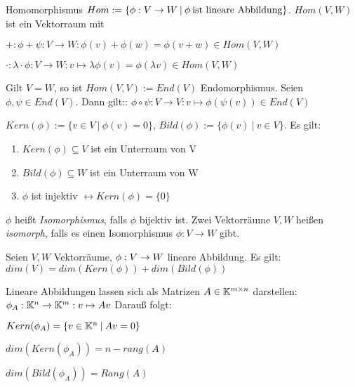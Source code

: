 \begin{definition}
	Homomorphismus $Hom := \{\phi : V \rightarrow W \medspace | \medspace \phi \medspace \textnormal{ist lineare Abbildung}\}$.  $Hom(V,W)$ ist ein Vektorraum mit
	\begin{description}[noitemsep]
		\item $+ : \phi + \psi : V \rightarrow W : \phi(v) + \phi(w) = \phi(v + w) \in Hom(V,W)$
		\item $\cdot : \lambda \cdot \phi : V \rightarrow W : v \mapsto \lambda \phi(v) = \phi(\lambda v) \in Hom(V,W)$
	\end{description}

	Gilt $V = W$, so ist $Hom(V,V) := End(V)$ Endomorphismus. Seien $\phi, \psi \in End(V)$. Dann gilt:: $\phi \circ \psi : V \rightarrow V : v \mapsto \phi(\psi(v)) \in End(V)$
\end{definition}

\begin{definition}
	$Kern(\phi) := \{v \in V \medspace | \medspace \phi(v) = 0\}$, $Bild(\phi) := \{\phi(v) \medspace | \medspace v \in V\}$. 
		Es gilt:	

	\begin{enumerate}[noitemsep]
		\item $Kern(\phi) \subseteq V$ ist ein Unterraum von V
		\item $Bild(\phi) \subseteq W$ ist ein Unterraum von W
		\item $\phi$ ist injektiv $\leftrightarrow Kern(\phi) = \{0\}$
	\end{enumerate}
\end{definition}

\begin{definition}[Isomorphismus]
	$\phi$ heißt \emph{Isomorphismus}, falls $\phi$ bijektiv ist. Zwei Vektorräume $V,W$ heißen \emph{isomorph}, falls es einen Isomorphismus $\phi : V \rightarrow W$ gibt.
\end{definition}

\begin{satz}[Dimensionssatz]
	Seien $V,W$ Vektorräume, $\phi : V \rightarrow W$ lineare Abbildung. Es gilt: $dim(V) = dim(Kern(\phi)) + dim(Bild(\phi))$
\end{satz}

\begin{definition}
	Lineare Abbildungen lassen sich als Matrizen $A \in \mathbb{K}^{m \times n}$ darstellen: $\phi_A : \mathbb{K}^n \rightarrow \mathbb{K}^m : v \mapsto Av$ Darauß folgt:
	\begin{description}[noitemsep]
		\item $Kern(\phi_A) = \{v \in \mathbb{K}^n \medspace | \medspace Av = 0\}$
		\item $dim(Kern(\phi_A)) = n - rang(A)$
		\item $dim(Bild(\phi_A)) = Rang(A)$
	\end{description}
\end{definition}

